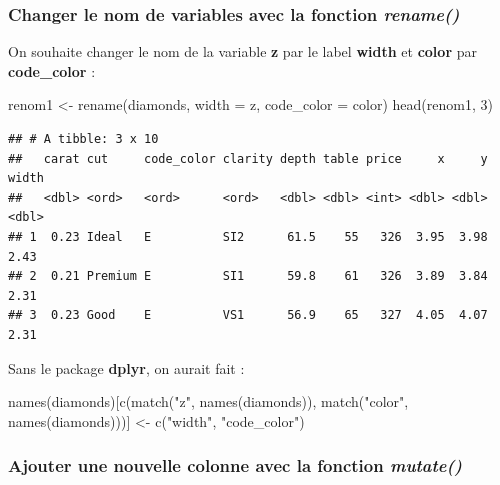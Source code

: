 \documentclass[
]{book}
\newenvironment{Shaded}{\begin{snugshade}}{\end{snugshade}}
\newcommand{\AttributeTok}[1]{\textcolor[rgb]{0.77,0.63,0.00}{#1}}
\newcommand{\DecValTok}[1]{\textcolor[rgb]{0.00,0.00,0.81}{#1}}
\newcommand{\FunctionTok}[1]{\textcolor[rgb]{0.00,0.00,0.00}{#1}}
\newcommand{\NormalTok}[1]{#1}
\newcommand{\OtherTok}[1]{\textcolor[rgb]{0.56,0.35,0.01}{#1}}
\newcommand{\StringTok}[1]{\textcolor[rgb]{0.31,0.60,0.02}{#1}}
\theoremstyle{definition}
\theoremstyle{definition}
\theoremstyle{definition}
\theoremstyle{definition}
\theoremstyle{remark}
\begin{document}
\hypertarget{changer-le-nom-de-variables-avec-la-fonction-rename}{%
\subsubsection{\texorpdfstring{Changer le nom de variables avec la fonction \emph{rename()}}{Changer le nom de variables avec la fonction rename()}}\label{changer-le-nom-de-variables-avec-la-fonction-rename}}

On souhaite changer le nom de la variable \textbf{z} par le label \textbf{width} et \textbf{color} par \textbf{code\_color} :

\begin{Shaded}
\begin{Highlighting}[]
\NormalTok{renom1 }\OtherTok{\textless{}{-}} \FunctionTok{rename}\NormalTok{(diamonds, }\AttributeTok{width =}\NormalTok{ z, }\AttributeTok{code\_color =}\NormalTok{ color)}
\FunctionTok{head}\NormalTok{(renom1, }\DecValTok{3}\NormalTok{)}
\end{Highlighting}
\end{Shaded}

\begin{verbatim}
## # A tibble: 3 x 10
##   carat cut     code_color clarity depth table price     x     y width
##   <dbl> <ord>   <ord>      <ord>   <dbl> <dbl> <int> <dbl> <dbl> <dbl>
## 1  0.23 Ideal   E          SI2      61.5    55   326  3.95  3.98  2.43
## 2  0.21 Premium E          SI1      59.8    61   326  3.89  3.84  2.31
## 3  0.23 Good    E          VS1      56.9    65   327  4.05  4.07  2.31
\end{verbatim}

Sans le package \textbf{dplyr}, on aurait fait :

\begin{Shaded}
\begin{Highlighting}[]
\FunctionTok{names}\NormalTok{(diamonds)[}\FunctionTok{c}\NormalTok{(}\FunctionTok{match}\NormalTok{(}\StringTok{"z"}\NormalTok{, }\FunctionTok{names}\NormalTok{(diamonds)), }
                  \FunctionTok{match}\NormalTok{(}\StringTok{"color"}\NormalTok{, }\FunctionTok{names}\NormalTok{(diamonds)))] }\OtherTok{\textless{}{-}} 
  \FunctionTok{c}\NormalTok{(}\StringTok{"width"}\NormalTok{, }\StringTok{"code\_color"}\NormalTok{)}
\end{Highlighting}
\end{Shaded}

\hypertarget{ajouter-une-nouvelle-colonne-avec-la-fonction-mutate}{%
\subsubsection{\texorpdfstring{Ajouter une nouvelle colonne avec la fonction \emph{mutate()}}{Ajouter une nouvelle colonne avec la fonction mutate()}}\label{ajouter-une-nouvelle-colonne-avec-la-fonction-mutate}}
\end{document}
